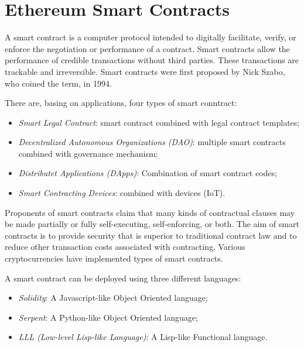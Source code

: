 \section{Ethereum Smart Contracts}
A smart contract \cite{clack2016smart} is a computer protocol intended to digitally facilitate, verify, or enforce the negotiation or performance of a contract. Smart contracts allow the performance of credible transactions without third parties. These transactions are trackable and irreversible. Smart contracts were first proposed by Nick Szabo, who coined the term, in 1994.

There are, basing on applications, four types of smart conntract:
\begin{itemize}
    \item \textit{Smart Legal Contract}: smart contract combined with legal contract templates;
    \item \textit{Decentralized Autonomous Organizations (DAO)}: multiple smart contracts combined with governance mechanism;
    \item \textit{Distributet Applications (DApps)}: Combination of smart contract codes;
    \item \textit{Smart Contracting Devices}: combined with devices (IoT).
\end{itemize}

Proponents of smart contracts claim that many kinds of contractual clauses may be made partially or fully self-executing, self-enforcing, or both. The aim of smart contracts is to provide security that is superior to traditional contract law and to reduce other transaction costs associated with contracting. Various cryptocurrencies have implemented types of smart contracts. 

A smart contract can be deployed using three different languages:
\begin{itemize}
    \item \textit{Solidity}: A Javascript-like Object Oriented language;
    \item \textit{Serpent}: A Python-like Object Oriented language;
    \item \textit{LLL (Low-level Lisp-like Language)}: A Lisp-like Functional language.
\end{itemize}


